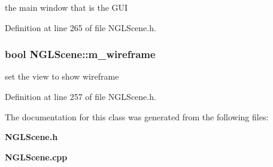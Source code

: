 the main window that is the G\-U\-I 



Definition at line 265 of file N\-G\-L\-Scene.\-h.

\subsubsection[{m\-\_\-wireframe}]{\setlength{\rightskip}{0pt plus 5cm}bool N\-G\-L\-Scene\-::m\-\_\-wireframe\hspace{0.3cm}{\ttfamily [private]}}\label{class_n_g_l_scene_a3fbe1d021368703df44093b8f6794226}


set the view to show wireframe 



Definition at line 257 of file N\-G\-L\-Scene.\-h.



The documentation for this class was generated from the following files\-:\begin{DoxyCompactItemize}
\item 
{\bf N\-G\-L\-Scene.\-h}\item 
{\bf N\-G\-L\-Scene.\-cpp}\end{DoxyCompactItemize}
